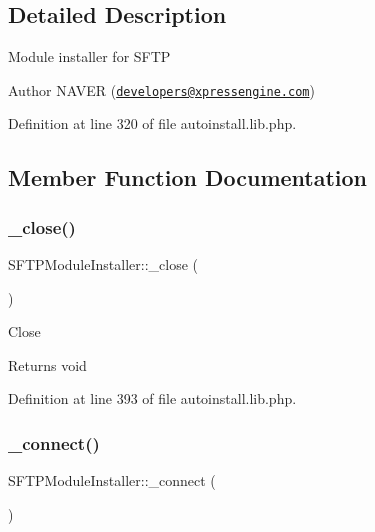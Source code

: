 \subsection{Detailed Description}
Module installer for S\+F\+TP \begin{DoxyAuthor}{Author}
N\+A\+V\+ER (\href{mailto:developers@xpressengine.com}{\tt developers@xpressengine.\+com}) 
\end{DoxyAuthor}


Definition at line 320 of file autoinstall.\+lib.\+php.



\subsection{Member Function Documentation}
\hypertarget{classSFTPModuleInstaller_a6f2c54d7303968d97d1026a00ba0961a}{}\label{classSFTPModuleInstaller_a6f2c54d7303968d97d1026a00ba0961a} 
\subsubsection{\texorpdfstring{\+\_\+close()}{\_close()}}
{\footnotesize\ttfamily S\+F\+T\+P\+Module\+Installer\+::\+\_\+close (\begin{DoxyParamCaption}{ }\end{DoxyParamCaption})}

Close

\begin{DoxyReturn}{Returns}
void 
\end{DoxyReturn}


Definition at line 393 of file autoinstall.\+lib.\+php.

\hypertarget{classSFTPModuleInstaller_a50b67d17519fb8e86aa5c44031daa63f}{}\label{classSFTPModuleInstaller_a50b67d17519fb8e86aa5c44031daa63f} 
\subsubsection{\texorpdfstring{\+\_\+connect()}{\_connect()}}
{\footnotesize\ttfamily S\+F\+T\+P\+Module\+Installer\+::\+\_\+connect (\begin{DoxyParamCaption}{ }\end{DoxyParamCaption})}

